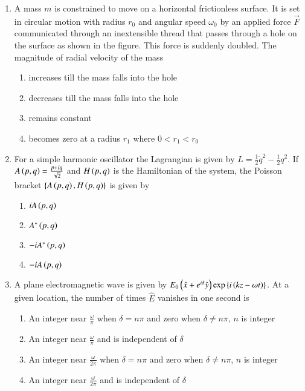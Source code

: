 \documentclass[journal]{IEEEtran}
\begin{document}
\begin{enumerate}
    \item A mass $m$ is constrained to move on a horizontal frictionless surface. It is set in circular motion with radius $r_0$ and angular speed $\omega_0$ by an applied force $\overrightarrow{F}$ communicated through an inextensible thread that passes through a hole on the surface as shown in the figure. This force is suddenly doubled. The magnitude of radial velocity of the mass 

    

            \begin{enumerate}
                \item increases till the mass falls into the hole
                \item decreases till the mass falls into the hole
                \item remains constant
                \item becomes zero at a radius $r_1$ where $0<r_1<r_0$
            \end{enumerate}


    \item For a simple harmonic oscillator the Lagrangian is given by $L=\frac{1}{2}\dot{q}^2-\frac{1}{2}q^2$. If $A\left(p, q\right)=\frac{p+iq}{\sqrt{2}}$ and $H\left(p,q\right)$ is the Hamiltonian of the system, the Poisson bracket $\left\{ A\left(p,q\right),H\left(p,q\right)\right\}$ is given by

    \begin{multicols}{4}
        \begin{enumerate}
            \item $iA\left(p,q\right)$
            \item $A^*\left(p,q\right)$
            \item $-iA^*\left(p,q\right)$
            \item $-iA\left(p,q\right)$
        \end{enumerate}
    \end{multicols}

    \item A plane electromagnetic wave is given by $E_0\left(\hat{x}+e^{i\delta} \hat{y}\right)\exp\left\{i\left(kz-\omega t\right)\right\}$. At a given location, the number of times $\hat{E}$ vanishes in one second is


            \begin{enumerate}
                \item An integer near $\frac{\omega}{\pi}$ when $\delta=n\pi$ and zero when $\delta\neq n\pi$, $n$ is integer
                \item An integer near $\frac{\omega}{\pi}$ and is independent of $\delta$
                \item An integer near $\frac{\omega}{2\pi}$ when $\delta=n\pi$ and zero when $\delta\neq n\pi$, $n$ is integer
                \item An integer near $\frac{\omega}{2\pi}$ and is independent of $\delta$
            \end{enumerate}



\end{enumerate}
\end{document}
